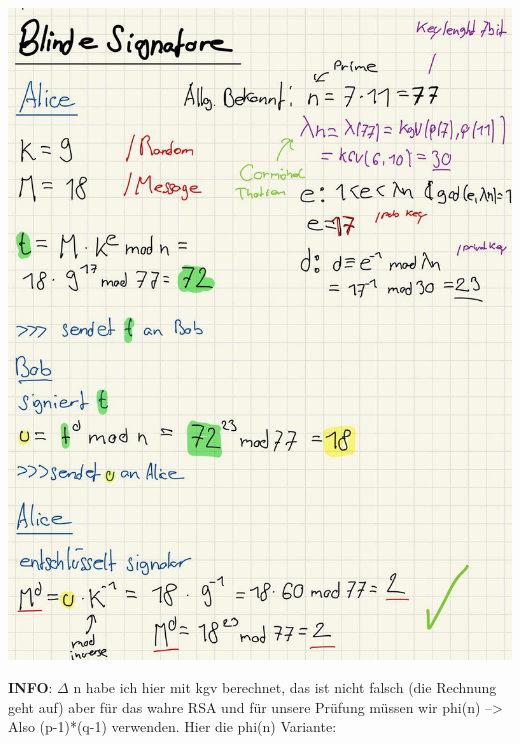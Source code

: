 \documentclass[11pt]{article}
\begin{document}
\begin{center}
	\includegraphics[scale=0.85]{img/blindsig.jpg}
\end{center}

\textbf{INFO}: \(\Delta\) n habe ich hier mit kgv berechnet, das ist
nicht falsch (die Rechnung geht auf) aber für das wahre RSA und für
unsere Prüfung müssen wir phi(n) --\textgreater{} Also (p-1)*(q-1)
verwenden. Hier die phi(n) Variante:
\end{document}
